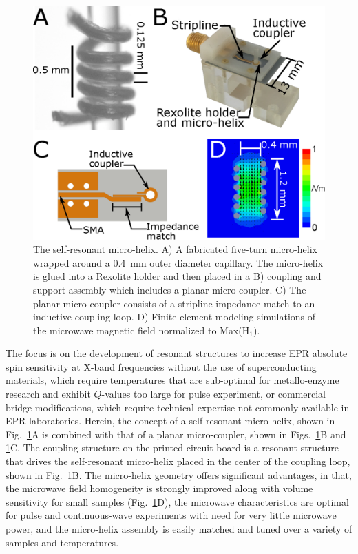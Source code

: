 \begin{figure}[htb]
\centering
 \includegraphics{Kapitel/Ch4-Images/01-MicroHelixHolder_Big2.eps}
 \caption[The self-resonant micro-helix.]{ The self-resonant micro-helix. A) A fabricated five-turn micro-helix wrapped around a 0.4~mm outer diameter capillary. The micro-helix is glued into a Rexolite holder and then placed in a B) coupling and support assembly which includes a planar micro-coupler. C) The planar micro-coupler consists of a stripline impedance-match to an inductive coupling loop. D) Finite-element modeling simulations of the microwave magnetic field normalized to Max(H$_1$).}
 \label{fig:fabricated}
\end{figure}

The focus is on the development of resonant structures to increase EPR absolute spin sensitivity at X-band frequencies without the use of superconducting materials, which require temperatures that are sub-optimal for metallo-enzyme research and exhibit $Q$-values too large for pulse experiment, or commercial bridge modifications, which require technical expertise not commonly available in EPR laboratories. Herein, the concept of a self-resonant micro-helix, shown in Fig.~\ref{fig:fabricated}A is combined with that of a planar micro-coupler, shown in Figs.~\ref{fig:fabricated}B and \ref{fig:fabricated}C. The coupling structure on the printed circuit board is a resonant structure that drives the self-resonant micro-helix placed in the center of the coupling loop,\cite{coupling2016} shown in Fig.~\ref{fig:fabricated}B. The micro-helix geometry offers significant advantages, in that, the microwave field homogeneity is strongly improved along with volume sensitivity for small samples (Fig.~\ref{fig:fabricated}D), the microwave characteristics are optimal for pulse and continuous-wave experiments with need for very little microwave power, and the micro-helix assembly is easily matched and tuned over a variety of samples and temperatures.


